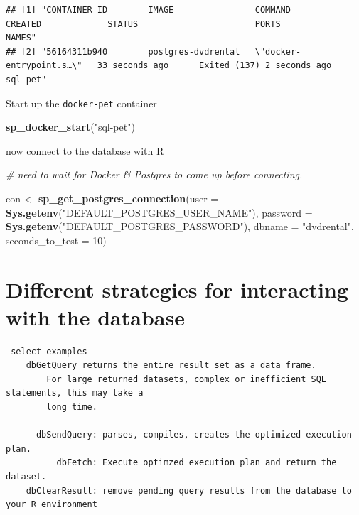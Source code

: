 \documentclass[]{book}
\newenvironment{Shaded}{\begin{snugshade}}{\end{snugshade}}
\newcommand{\CommentTok}[1]{\textcolor[rgb]{0.56,0.35,0.01}{\textit{#1}}}
\newcommand{\DataTypeTok}[1]{\textcolor[rgb]{0.13,0.29,0.53}{#1}}
\newcommand{\DecValTok}[1]{\textcolor[rgb]{0.00,0.00,0.81}{#1}}
\newcommand{\KeywordTok}[1]{\textcolor[rgb]{0.13,0.29,0.53}{\textbf{#1}}}
\newcommand{\NormalTok}[1]{#1}
\newcommand{\StringTok}[1]{\textcolor[rgb]{0.31,0.60,0.02}{#1}}
\theoremstyle{definition}
\theoremstyle{definition}
\theoremstyle{definition}
\theoremstyle{remark}
\begin{document}
\begin{verbatim}
## [1] "CONTAINER ID        IMAGE                COMMAND                  CREATED             STATUS                       PORTS               NAMES"    
## [2] "56164311b940        postgres-dvdrental   \"docker-entrypoint.s…\"   33 seconds ago      Exited (137) 2 seconds ago                       sql-pet"
\end{verbatim}

Start up the \texttt{docker-pet} container

\begin{Shaded}
\begin{Highlighting}[]
\KeywordTok{sp_docker_start}\NormalTok{(}\StringTok{"sql-pet"}\NormalTok{)}
\end{Highlighting}
\end{Shaded}

now connect to the database with R

\begin{Shaded}
\begin{Highlighting}[]
\CommentTok{# need to wait for Docker & Postgres to come up before connecting.}

\NormalTok{con <-}\StringTok{ }\KeywordTok{sp_get_postgres_connection}\NormalTok{(}\DataTypeTok{user =} \KeywordTok{Sys.getenv}\NormalTok{(}\StringTok{"DEFAULT_POSTGRES_USER_NAME"}\NormalTok{),}
                         \DataTypeTok{password =} \KeywordTok{Sys.getenv}\NormalTok{(}\StringTok{"DEFAULT_POSTGRES_PASSWORD"}\NormalTok{),}
                         \DataTypeTok{dbname =} \StringTok{"dvdrental"}\NormalTok{,}
                         \DataTypeTok{seconds_to_test =} \DecValTok{10}\NormalTok{)}
\end{Highlighting}
\end{Shaded}

\hypertarget{different-strategies-for-interacting-with-the-database}{%
\section{Different strategies for interacting with the
database}\label{different-strategies-for-interacting-with-the-database}}

\begin{verbatim}
 select examples
    dbGetQuery returns the entire result set as a data frame.  
        For large returned datasets, complex or inefficient SQL statements, this may take a 
        long time.

      dbSendQuery: parses, compiles, creates the optimized execution plan.  
          dbFetch: Execute optimzed execution plan and return the dataset.
    dbClearResult: remove pending query results from the database to your R environment
\end{verbatim}
\end{document}
